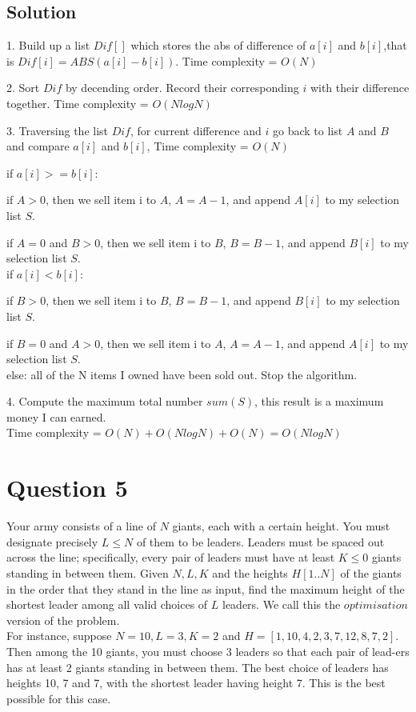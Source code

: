 \documentclass[a4paper,12pt]{article}
\begin{document}
\subsection*{Solution}

1. Build up a list $Dif[]$ which stores the abs of difference of $a[i]$ and $b[i]$,that is $Dif[i]=ABS(a[i]-b[i])$. Time complexity = $O(N)$

2. Sort $Dif$ by decending order. Record their corresponding $i$ with their difference together. Time complexity = $O(NlogN)$

3. Traversing the list $Dif$, for current difference and $i$ go back to list $A$ and $B$ and compare $a[i]$ and $b[i]$, Time complexity = $O(N)$

if $a[i] >= b[i]$: 

if $A>0$, then we sell item i to $A$, $A = A - 1$, and append $A[i]$ to my selection list $S$.

if $A=0$ and $B>0$, then we sell item i to $B$, $B = B - 1$, and append $B[i]$ to my selection list $S$.\\

if $a[i] < b[i]$:

if $B>0$, then we sell item i to $B$, $B = B - 1$, and append $B[i]$ to my selection list $S$.

if $B=0$ and $A>0$, then we sell item i to $A$, $A = A - 1$, and append $A[i]$ to my selection list $S$.\\

else:
all of the N items I owned have been sold out. Stop the algorithm.

4. Compute the maximum total number $sum(S)$, this result is a maximum money I can earned.\\

Time complexity = $O(N) + O(NlogN) + O(N) = O(NlogN)$










\newpage

\section*{Question 5}

Your army consists of a line of $N$ giants, each with a certain height. You must designate precisely $L \leq N$ of them to be leaders. Leaders must be spaced out across the line; specifically, every pair of leaders must have at least $K \leq 0$ giants standing in between them. Given $N, L, K$ and the heights $H[1..N]$ of the giants in the order that they stand in the line as input, find the maximum height of the shortest leader among all valid choices of $L$ leaders. We call this the $optimisation$ version of the problem.\\
For instance, suppose $N = 10, L = 3, K = 2$ and $H = [1, 10, 4, 2, 3, 7, 12, 8, 7, 2]$. Then among the 10 giants, you must choose 3 leaders so that each pair of lead-ers has at least 2 giants standing in between them. The best choice of leaders has heights 10, 7 and 7, with the shortest leader having height 7. This is the best possible for this case.
\end{document}
